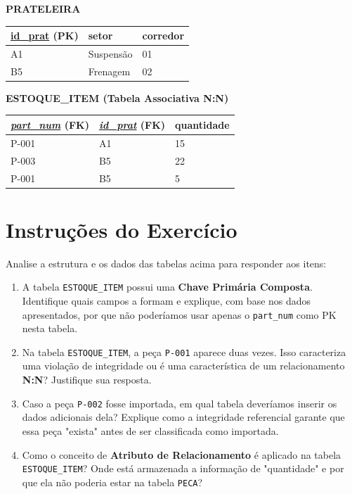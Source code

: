 \documentclass[12pt]{article}
\begin{document}
\begin{table}[H]
    \vspace{0.6cm}

    \textbf{PRATELEIRA}\\
    \begin{tabular}{|l|l|l|}
    \hline
    \rowcolor{tableheader} \underline{id\_prat} (PK) & setor & corredor \\ \hline
    A1 & Suspensão & 01 \\ \hline
    B5 & Frenagem & 02 \\ \hline
    \end{tabular}

    \vspace{0.6cm}

    \textbf{ESTOQUE\_ITEM (Tabela Associativa N:N)}\\
    \begin{tabular}{|l|l|l|}
    \hline
    \rowcolor{tableheader} \underline{\textit{part\_num}} (FK) & \underline{\textit{id\_prat}} (FK) & quantidade \\ \hline
    P-001 & A1 & 15 \\ \hline
    P-003 & B5 & 22 \\ \hline
    P-001 & B5 & 5 \\ \hline
    \end{tabular}
\end{table}



\section*{Instruções do Exercício}

Analise a estrutura e os dados das tabelas acima para responder aos itens:

\begin{enumerate}[label=\alph*)]
    \item A tabela \texttt{ESTOQUE\_ITEM} possui uma \textbf{Chave Primária Composta}. Identifique quais campos a formam e explique, com base nos dados apresentados, por que não poderíamos usar apenas o \texttt{part\_num} como PK nesta tabela.
    
    \item Na tabela \texttt{ESTOQUE\_ITEM}, a peça \texttt{P-001} aparece duas vezes. Isso caracteriza uma violação de integridade ou é uma característica de um relacionamento \textbf{N:N}? Justifique sua resposta.
    
    \item Caso a peça \texttt{P-002} fosse importada, em qual tabela deveríamos inserir os dados adicionais dela? Explique como a integridade referencial garante que essa peça "exista" antes de ser classificada como importada.
    
    \item Como o conceito de \textbf{Atributo de Relacionamento} é aplicado na tabela \texttt{ESTOQUE\_ITEM}? Onde está armazenada a informação de "quantidade" e por que ela não poderia estar na tabela \texttt{PECA}?
\end{enumerate}
\end{document}
